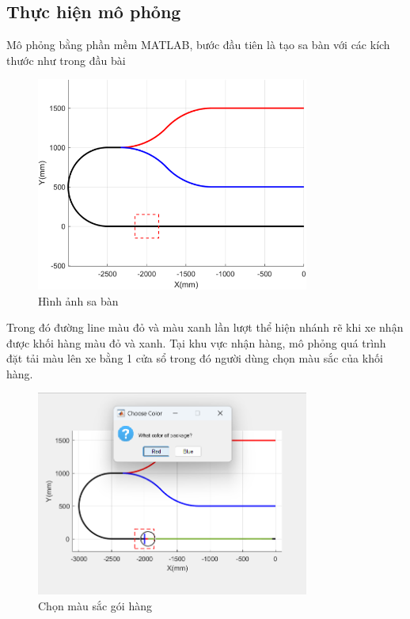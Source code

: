           \subsection{Thực hiện mô phỏng}
               \hspace*{0.6cm}Mô phỏng bằng phần mềm MATLAB, bước đầu tiên là tạo sa bàn với các kích thước như trong đầu bài
               \begin{figure}[H]
                    \centering
                    \includegraphics[width=0.8\textwidth]{pictures/chapter8/saban.png}
                    \caption{Hình ảnh sa bàn}
                    \label{saban}
               \end{figure}
               \hspace*{0.6cm}Trong đó đường line màu đỏ và màu xanh lần lượt thể hiện nhánh rẽ khi xe nhận được khối hàng màu đỏ và xanh. Tại khu vực nhận hàng, mô phỏng quá trình đặt tải màu lên xe bằng 1 cửa sổ trong đó người dùng chọn màu sắc của khối hàng.
               \begin{figure}[H]
                    \centering
                    \includegraphics[width=0.8\textwidth]{pictures/chapter8/stop_for_package.png}
                    \caption{Chọn màu sắc gói hàng}
                    \label{choose_color}
               \end{figure}
